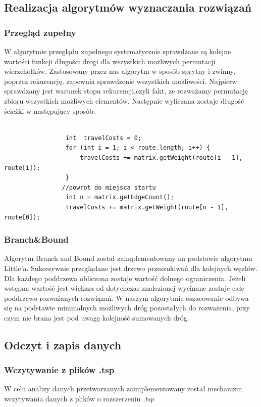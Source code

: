 \documentclass{article}
\begin{document}
	\subsection{Realizacja algorytmów wyznaczania rozwiązań}
		\subsubsection{Przegląd zupełny}
				W algorytmie przeglądu zupełnego systematycznie sprawdzane są kolejne wartości funkcji długości drogi dla wszystkich możliwych permutacji wierzchołków. Zastosowany przez nas algorytm w sposób sprytny i zwinny, poprzez rekurencję, zapewnia sprawdzenie wszystkich możliwości. Najpierw sprawdzany jest warunek stopu rekurencji,czyli fakt, ze rozważamy permutację zbioru wszystkich możliwych elementów. Następnie wyliczana zostaje długość ścieżki w następujący sposób:
				\begin{lstlisting}[xleftmargin=-150pt]
				
				 int  travelCosts = 0;
				 for (int i = 1; i < route.length; i++) {
					 travelCosts += matrix.getWeight(route[i - 1], route[i]);
				 }
				//powrot do miejsca startu
				 int n = matrix.getEdgeCount();
				 travelCosts += matrix.getWeight(route[n - 1], route[0]);
				\end{lstlisting}
		\subsubsection{Branch\&Bound}
			Algorytm Branch and Bound został zaimplementowany na podstawie algorytmu Little'a. Sukcesywnie przeglądane jest drzewo przeszukiwań dla kolejnych węzłów. Dla każdego poddrzewa obliczona zostaje wartość dolnego ograniczenia. Jeżeli wstępna wartość jest większa od dotychczas znalezionej wycinane zostaje całe poddrzewo rozważanych rozwiązań. W naszym algorytmie oszacowanie odbywa się na podstawie minimalnych możliwych dróg pozostałych do rozważenia, przy czym nie brana jest pod uwagę kolejność sumowanych dróg. 
	\subsection{Odczyt i zapis danych}
		\subsubsection{Wczytywanie z plików .tsp}
			W celu analizy danych przetwarzanych zaimplementowany został mechanizm wczytywania danych z plików o rozszerzeniu {\it .tsp}
			
\end{document}
